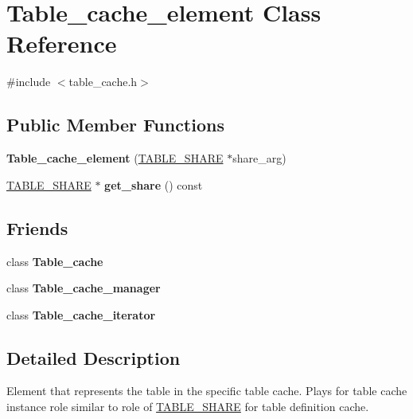 \hypertarget{classTable__cache__element}{}\section{Table\+\_\+cache\+\_\+element Class Reference}
\label{classTable__cache__element}


{\ttfamily \#include $<$table\+\_\+cache.\+h$>$}

\subsection*{Public Member Functions}
\begin{DoxyCompactItemize}
\item 
\mbox{\label{classTable__cache__element_a42fa6eb7ad203038b65a2e25be427f92}} 
{\bfseries Table\+\_\+cache\+\_\+element} (\mbox{\hyperlink{structTABLE__SHARE}{T\+A\+B\+L\+E\+\_\+\+S\+H\+A\+RE}} $\ast$share\+\_\+arg)
\item 
\mbox{\label{classTable__cache__element_a96cb701a77950c1a1c3fd1155f0d5b2b}} 
\mbox{\hyperlink{structTABLE__SHARE}{T\+A\+B\+L\+E\+\_\+\+S\+H\+A\+RE}} $\ast$ {\bfseries get\+\_\+share} () const
\end{DoxyCompactItemize}
\subsection*{Friends}
\begin{DoxyCompactItemize}
\item 
\mbox{\label{classTable__cache__element_adfcb4c0b76472625c718f0176f1943ef}} 
class {\bfseries Table\+\_\+cache}
\item 
\mbox{\label{classTable__cache__element_ab0f93765cb224a20158d5ee91901bc13}} 
class {\bfseries Table\+\_\+cache\+\_\+manager}
\item 
\mbox{\label{classTable__cache__element_a08fcc4e2cad8dc13a757eb4180d2edf0}} 
class {\bfseries Table\+\_\+cache\+\_\+iterator}
\end{DoxyCompactItemize}


\subsection{Detailed Description}
Element that represents the table in the specific table cache. Plays for table cache instance role similar to role of \mbox{\hyperlink{structTABLE__SHARE}{T\+A\+B\+L\+E\+\_\+\+S\+H\+A\+RE}} for table definition cache.

